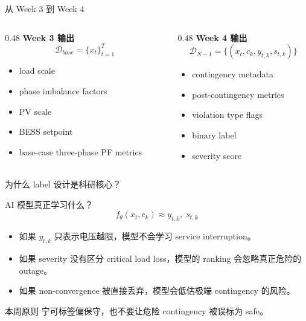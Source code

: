 \documentclass[aspectratio=169,11pt]{beamer}
\begin{document}
\begin{frame}{从 Week 3 到 Week 4}
\begin{columns}
\begin{column}{0.48\textwidth}
\textbf{Week 3 输出}\
\[
\mathcal{D}_{base}=\{x_t\}_{t=1}^{T}
\]
\begin{itemize}
  \item load scale
  \item phase imbalance factors
  \item PV scale
  \item BESS setpoint
  \item base-case three-phase PF metrics
\end{itemize}
\end{column}
\begin{column}{0.48\textwidth}
\textbf{Week 4 输出}\
\[
\mathcal{D}_{N-1}=\{(x_t,c_k,y_{t,k},s_{t,k})\}
\]
\begin{itemize}
  \item contingency metadata
  \item post-contingency metrics
  \item violation type flags
  \item binary label
  \item severity score
\end{itemize}
\end{column}
\end{columns}
\end{frame}

\begin{frame}{为什么 label 设计是科研核心？}
\begin{block}{AI 模型真正学习什么？}
\[
f_\theta(x_t,c_k) \approx y_{t,k},\; s_{t,k}
\]
\end{block}
\begin{itemize}
  \item 如果 $y_{t,k}$ 只表示电压越限，模型不会学习 service interruption。
  \item 如果 severity 没有区分 critical load loss，模型的 ranking 会忽略真正危险的 outage。
  \item 如果 non-convergence 被直接丢弃，模型会低估极端 contingency 的风险。
\end{itemize}
\begin{alertblock}{本周原则}
宁可标签偏保守，也不要让危险 contingency 被误标为 safe。
\end{alertblock}
\end{frame}
\end{document}
